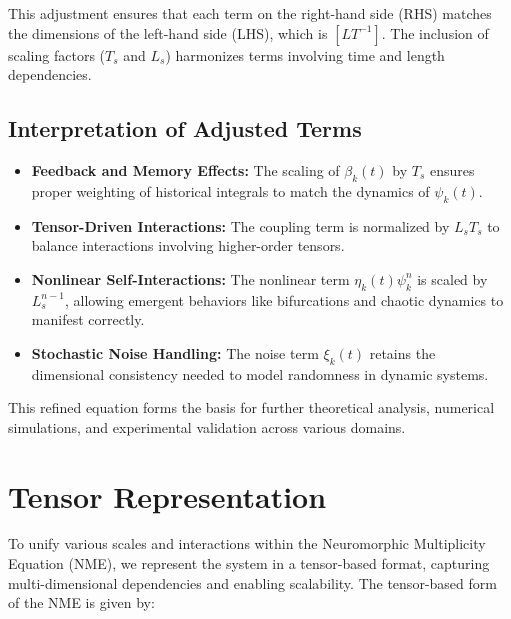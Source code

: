 \documentclass{article}
\theoremstyle{plain}
\begin{document}
\begin{itemize}
\begin{itemize}
This adjustment ensures that each term on the right-hand side (RHS) matches the dimensions of the left-hand side (LHS), which is \([L T^{-1}]\). The inclusion of scaling factors (\(T_s\) and \(L_s\)) harmonizes terms involving time and length dependencies.

\subsection{Interpretation of Adjusted Terms}
\begin{itemize}
    \item \textbf{Feedback and Memory Effects:} The scaling of \(\beta_k(t)\) by \(T_s\) ensures proper weighting of historical integrals to match the dynamics of \(\psi_k(t)\).
    \item \textbf{Tensor-Driven Interactions:} The coupling term is normalized by \(L_s T_s\) to balance interactions involving higher-order tensors.
    \item \textbf{Nonlinear Self-Interactions:} The nonlinear term \(\eta_k(t) \psi_k^n\) is scaled by \(L_s^{n-1}\), allowing emergent behaviors like bifurcations and chaotic dynamics to manifest correctly.
    \item \textbf{Stochastic Noise Handling:} The noise term \(\xi_k(t)\) retains the dimensional consistency needed to model randomness in dynamic systems.
\end{itemize}
This refined equation forms the basis for further theoretical analysis, numerical simulations, and experimental validation across various domains.


\section{Tensor Representation}

To unify various scales and interactions within the Neuromorphic Multiplicity Equation (NME), we represent the system in a tensor-based format, capturing multi-dimensional dependencies and enabling scalability. The tensor-based form of the NME is given by:


\end{itemize}
\end{itemize}
\end{document}
